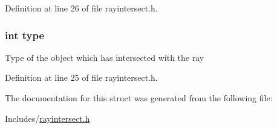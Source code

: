 Definition at line 26 of file rayintersect.\+h.

\subsubsection[{\texorpdfstring{type}{type}}]{\setlength{\rightskip}{0pt plus 5cm}int type}\hypertarget{structrayintersect_ac765329451135abec74c45e1897abf26}{}\label{structrayintersect_ac765329451135abec74c45e1897abf26}
Type of the object which has intersected with the ray 

Definition at line 25 of file rayintersect.\+h.



The documentation for this struct was generated from the following file\+:\begin{DoxyCompactItemize}
\item 
Includes/\hyperlink{rayintersect_8h}{rayintersect.\+h}\end{DoxyCompactItemize}
